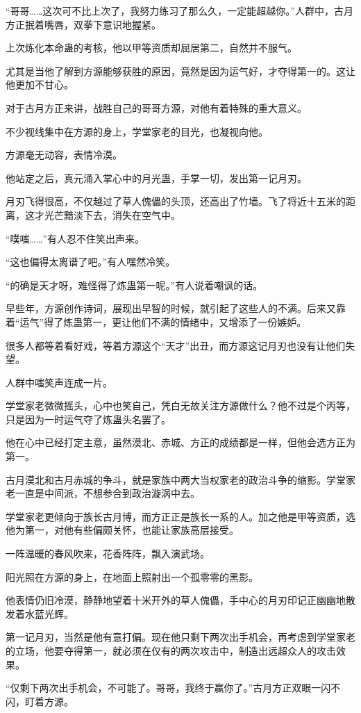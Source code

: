 \begin{this_body}
“哥哥……这次可不比上次了，我努力练习了那么久，一定能超越你。”人群中，古月方正抿着嘴唇，双拳下意识地握紧。

上次炼化本命蛊的考核，他以甲等资质却屈居第二，自然并不服气。

尤其是当他了解到方源能够获胜的原因，竟然是因为运气好，才夺得第一的。这让他更加不甘心。

对于古月方正来讲，战胜自己的哥哥方源，对他有着特殊的重大意义。

不少视线集中在方源的身上，学堂家老的目光，也凝视向他。

方源毫无动容，表情冷漠。

他站定之后，真元涌入掌心中的月光蛊，手掌一切，发出第一记月刃。

月刃飞得很高，不仅越过了草人傀儡的头顶，还高出了竹墙。飞了将近十五米的距离，这才光芒黯淡下去，消失在空气中。

“噗嗤……”有人忍不住笑出声来。

“这也偏得太离谱了吧。”有人嘿然冷笑。

“的确是天才呀，难怪得了炼蛊第一呢。”有人说着嘲讽的话。

早些年，方源创作诗词，展现出早智的时候，就引起了这些人的不满。后来又靠着“运气”得了炼蛊第一，更让他们不满的情绪中，又增添了一份嫉妒。

很多人都等着看好戏，等着方源这个“天才”出丑，而方源这记月刃也没有让他们失望。

人群中嗤笑声连成一片。

学堂家老微微摇头，心中也笑自己，凭白无故关注方源做什么？他不过是个丙等，只是因为一时运气夺了炼蛊头名罢了。

他在心中已经打定主意，虽然漠北、赤城、方正的成绩都是一样，但他会选方正为第一。

古月漠北和古月赤城的争斗，就是家族中两大当权家老的政治斗争的缩影。学堂家老一直是中间派，不想参合到政治漩涡中去。

学堂家老更倾向于族长古月博，而方正正是族长一系的人。加之他是甲等资质，选他为第一，对他有些偏颇关怀，也能让家族高层接受。

一阵温暖的春风吹来，花香阵阵，飘入演武场。

阳光照在方源的身上，在地面上照射出一个孤零零的黑影。

他表情仍旧冷漠，静静地望着十米开外的草人傀儡，手中心的月刃印记正幽幽地散发着水蓝光辉。

第一记月刃，当然是他有意打偏。现在他只剩下两次出手机会，再考虑到学堂家老的立场，他要夺得第一，就必须在仅有的两次攻击中，制造出远超众人的攻击效果。

“仅剩下两次出手机会，不可能了。哥哥，我终于赢你了。”古月方正双眼一闪不闪，盯着方源。


\end{this_body}
